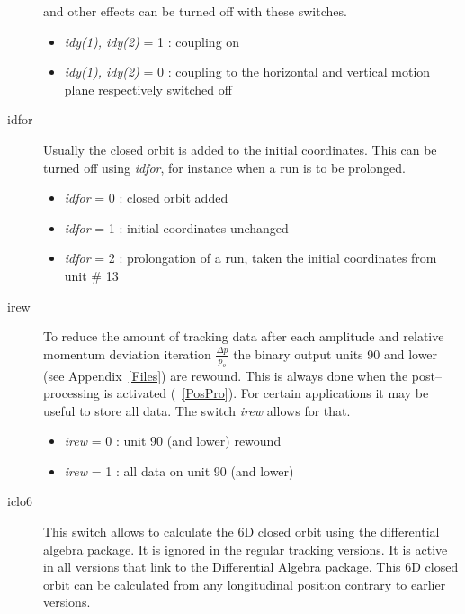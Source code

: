 \documentclass[a4paper,11pt]{report}
\begin{document}
\begin{description}
  and other effects can be turned off with these switches.
 \begin{itemize}
 \item {\em idy(1), idy(2)} \/= 1 : coupling on
 \item {\em idy(1), idy(2)} \/= 0 : coupling to the horizontal and
   vertical motion plane respectively switched off
 \end{itemize}
\item [idfor] Usually the closed orbit is added to the initial
  coordinates. This can be turned off using {\em idfor}\/, for
  instance when a run is to be prolonged.
 \begin{itemize}
 \item {\em idfor} \/= 0 : closed orbit added
 \item {\em idfor} \/= 1 : initial coordinates unchanged
 \item {\em idfor} \/= 2 : prolongation of a run, taken the initial
   coordinates from unit \# 13
 \end{itemize}
\item [irew] To reduce the amount of tracking data after each
  amplitude and relative momentum deviation iteration \mbox{$
    \frac{\Delta p}{p_o} $} the binary output units 90 and lower (see
  Appendix~\ref{Files}) are rewound.  This is always done when the
  post--processing is activated (~\ref{PosPro}). For certain
  applications it may be useful to store all data. The switch {\em
    irew} \/allows for that.
 \begin{itemize}
 \item {\em irew} \/= 0 : unit 90 (and lower) rewound
 \item {\em irew} \/= 1 : all data on unit 90 (and lower)
 \end{itemize}
\item [iclo6] This switch allows to calculate the 6D closed orbit
  using the differential algebra package. It is ignored in the regular
  tracking versions. It is active in all versions that link to the
  Differential Algebra package. This 6D closed orbit can be calculated
  from any longitudinal position contrary to earlier versions.


\end{description}
\end{document}
